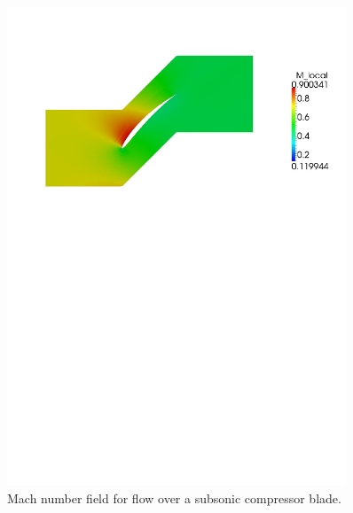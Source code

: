 \begin{figure}[htbp]
\begin{center}
\includegraphics[width=0.9\textwidth,viewport=24 495 570 817]{../2D/turbo_sc10/mach-field.pdf}
\end{center}
\caption{Mach number field for flow over a subsonic compressor blade.}
\label{turbo-sc10-mach-fig}
\end{figure}

